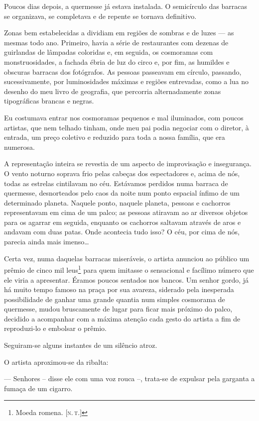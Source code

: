 Poucos dias depois, a quermesse já estava instalada. O semicírculo das barracas se organizava, se completava e de repente se tornava definitivo.

Zonas bem estabelecidas a dividiam em regiões de sombras e de luzes --- as mesmas todo ano. Primeiro, havia a série de restaurantes com dezenas de guirlandas de lâmpadas coloridas e, em seguida, os cosmoramas com monstruosidades, a fachada ébria de luz do circo e, por fim, as humildes e obscuras barracas dos fotógrafos. As pessoas passeavam em círculo, passando, sucessivamente, por luminosidades máximas e regiões entrevadas, como a lua no desenho do meu livro de geografia, que percorria alternadamente zonas tipográficas brancas e negras.

Eu costumava entrar nos cosmoramas pequenos e mal iluminados, com poucos artistas, que nem telhado tinham, onde meu pai podia negociar com o diretor, à entrada, um preço coletivo e reduzido para toda a nossa família, que era numerosa.

A representação inteira se revestia de um aspecto de improvisação e insegurança. O vento noturno soprava frio pelas cabeças dos espectadores e, acima de nós, todas as estrelas cintilavam no céu. Estávamos perdidos numa barraca de quermesse, desnorteados pelo caos da noite num ponto espacial ínfimo de um determinado planeta. Naquele ponto, naquele planeta, pessoas e cachorros representavam em cima de um palco; as pessoas atiravam ao ar diversos objetos para os agarrar em seguida, enquanto os cachorros saltavam através de aros e andavam com duas patas. Onde acontecia tudo isso? O céu, por cima de nós, parecia ainda mais imenso\dots

Certa vez, numa daquelas barracas miseráveis, o artista anunciou ao público um prêmio de cinco mil leus\footnote{Moeda romena. {[}\textsc{n.\,t.}{]}} para quem imitasse o sensacional e facílimo número que ele viria a apresentar. Éramos poucos sentados nos bancos. Um senhor gordo, já há muito tempo famoso na praça por sua avareza, siderado pela inesperada possibilidade de ganhar uma grande quantia num simples cosmorama de quermesse, mudou bruscamente de lugar para ficar mais próximo do palco, decidido a acompanhar com a máxima atenção cada gesto do artista a fim de reproduzi-lo e embolsar o prêmio.

Seguiram-se alguns instantes de um silêncio atroz.

O artista aproximou-se da ribalta: 

--- Senhores -- disse ele com uma voz rouca --, trata-se de expulsar pela garganta a fumaça de um cigarro. 

